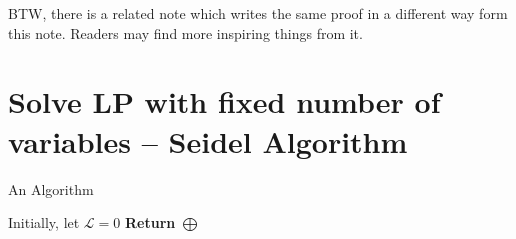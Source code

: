 \documentclass[11pt]{article}
\begin{document}
BTW, there is a related note \cite{GeometricSetCover} which writes the same proof in a different way form this note. 
Readers may find more inspiring things from it.  


\section{Solve LP with fixed number of variables -- Seidel Algorithm}




\begin{algorithm}[h]
\caption{An Algorithm}
\label{algo2}
Initially, let $\mathcal{L} = 0$\;
{\bf Return} $\bigoplus$\;
\cite{har2012weighted}
\end{algorithm}
\cite{Seidel}


\end{document}

